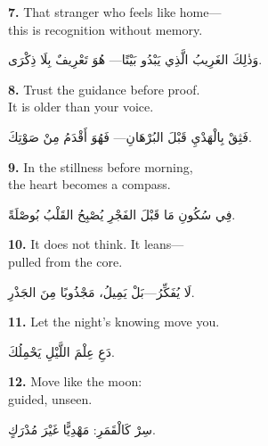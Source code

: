 \documentclass[11pt,a4paper,twoside]{book}
\begin{document}
\vspace{1em}
{\color{indigo}\bfseries 7.}\quad
That stranger who feels like home—\\
this is recognition without memory.

\begin{flushright}
{\arabicfont
وَذٰلِكَ الغَرِيبُ الَّذِي يَبْدُو بَيْتًا—
هُوَ تَعْرِيفٌ بِلَا ذِكْرَى.}
\end{flushright}

\vspace{1em}
{\color{indigo}\bfseries 8.}\quad
Trust the guidance before proof.\\
It is older than your voice.

\begin{flushright}
{\arabicfont
فَثِقْ بِالْهَدْيِ قَبْلَ البُرْهَانِ—
فَهُوَ أَقْدَمُ مِنْ صَوْتِكَ.}
\end{flushright}

\vspace{1em}
{\color{indigo}\bfseries 9.}\quad
In the stillness before morning,\\
the heart becomes a compass.

\begin{flushright}
{\arabicfont
فِي سُكُونِ مَا قَبْلَ الفَجْرِ
يُصْبِحُ القَلْبُ بُوصْلَةً.}
\end{flushright}

\vspace{1em}
{\color{indigo}\bfseries 10.}\quad
It does not think. It leans—\\
pulled from the core.

\begin{flushright}
{\arabicfont
لَا يُفَكِّرُ—بَلْ يَمِيلُ،
مَجْذُوبًا مِنَ الجَذْرِ.}
\end{flushright}

\vspace{1em}
{\color{indigo}\bfseries 11.}\quad
Let the night's knowing move you.

\begin{flushright}
{\arabicfont
دَعِ عِلْمَ اللَّيْلِ يَحْمِلُكَ.}
\end{flushright}

\vspace{1em}
{\color{indigo}\bfseries 12.}\quad
Move like the moon:\\
guided, unseen.

\begin{flushright}
{\arabicfont
سِرْ كَالْقَمَرِ:
مَهْدِيًّا غَيْرَ مُدْرَكٍ.}
\end{flushright}
\end{document}
